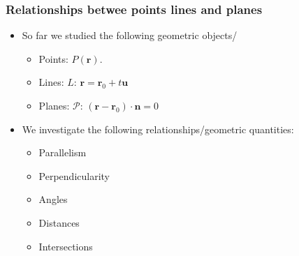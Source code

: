 \begin{frame}
\frametitle{Relationships betwee points lines and planes}

\begin{itemize}
\item So far we studied the following geometric objects/
\begin{itemize}
\item Points: $P(\textbf{r})$.
\item Lines: $L$: $\textbf{r}= \textbf{r}_0 + t\textbf{u}$
\item Planes: $\mathcal{P}$: $(\textbf{r}-\textbf{r}_0)\cdot \textbf{n} =0$
\end{itemize}
\item We investigate the following relationships/geometric quantities:
\begin{itemize}
\item Parallelism
\item Perpendicularity
\item Angles
\item Distances
\item Intersections
\end{itemize}
\end{itemize}
\end{frame}